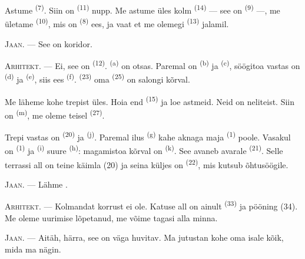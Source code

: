 Astume  \textsuperscript{(7)}. Siin on 
\textsuperscript{(11)} nupp. Me astume üles kolm  \textsuperscript{(14)}
--- see on  \textsuperscript{(9)} ---, me ületame 
\textsuperscript{(10)}, mis on  \textsuperscript{(8)} ees, ja vaat
et me olemegi  \textsuperscript{(13)} jalamil.

\textsc{Jaan}. --- See on koridor.

\textsc{Arhitekt}. --- Ei, see on  \textsuperscript{(12)}.
 \textsuperscript{(a)} on otsas. Paremal on 
\textsuperscript{(b)} ja  \textsuperscript{(c)}, söögitoa vastas on
 \textsuperscript{(d)} ja  \textsuperscript{(e)}, siis
ees \textsuperscript{(f)}.  \textsuperscript{(23)} oma
 \textsuperscript{(25)} on salongi kõrval.

Me läheme kohe trepist üles. Hoia end  \textsuperscript{(15)} ja loe
astmeid. Neid on neliteist. Siin on  \textsuperscript{(m)}, me oleme
teisel  \textsuperscript{(27)}.

\VUsaut{3.0mm}
\VUsaut{3.0mm}

Trepi vastas on  \textsuperscript{(20)} ja 
\textsuperscript{(j)}. Paremal ilus  \textsuperscript{(g)} kahe
aknaga maja  \textsuperscript{(1)} poole. Vasakul on 
\textsuperscript{(1)} ja  \textsuperscript{(i)} suure
 \textsuperscript{(h)}: magamistoa kõrval on 
\textsuperscript{(k)}. See avaneb avarale  \textsuperscript{(21)}.
Selle terrassi all on teine käimla (20) ja seina küljes on 
\textsuperscript{(22)}, mis kutsub õhtusöögile.

\textsc{Jaan}. --- Lähme .

\textsc{Arhitekt}. --- Kolmandat korrust ei ole. Katuse all on ainult
 \textsuperscript{(33)} ja pööning (34). Me oleme uurimise lõpetanud,
me võime tagasi alla minna.

\textsc{Jaan}. --- Aitäh, härra, see on väga huvitav. Ma jutustan kohe oma isale kõik,
mida ma nägin.

\VUsaut{4.0mm}
\VUfilet{22mm}
